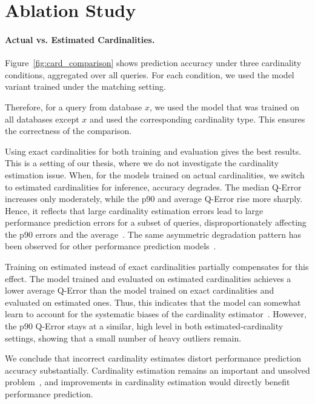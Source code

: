 \section{Ablation Study}\label{sec:evaluation_ablation}
\paragraph{Actual vs. Estimated Cardinalities.}

Figure~\ref{fig:card_comparison} shows prediction accuracy under three cardinality conditions, aggregated over all queries.
For each condition, we used the model variant trained under the matching setting.

Therefore, for a query from database $x$, we used the model
that was trained on all databases except $x$ and used the corresponding cardinality type.
This ensures the correctness of the comparison.

Using exact cardinalities for both training and evaluation gives the best results.
This is a setting of our thesis, where we do not investigate the cardinality estimation issue.
When, for the models trained on actual cardinalities, we switch to estimated cardinalities for inference, accuracy degrades.
The median Q-Error increases only moderately,
while the p90 and average Q-Error rise more sharply.
Hence, it reflects that large cardinality estimation errors lead to large performance prediction errors
for a subset of queries, disproportionately affecting the p90 errors and the average~\parencite{t3}.
The same asymmetric degradation pattern has been observed for other performance prediction models~\parencite{stage}.

Training on estimated instead of exact cardinalities partially compensates for this effect.
The model trained and evaluated on estimated cardinalities achieves
a lower average Q-Error than the model trained on exact cardinalities and evaluated on estimated ones.
Thus, this indicates that the model can somewhat learn to account for the systematic biases of the cardinality estimator~\parencite{leis2018job}.
However, the p90 Q-Error stays at a similar, high level in both estimated-cardinality settings, showing that a small number of heavy outliers remain.

We conclude that incorrect cardinality estimates distort performance prediction accuracy substantially.
Cardinality estimation remains an important and unsolved problem~\parencite{leis2018job},
and improvements in cardinality estimation would directly benefit performance prediction.

